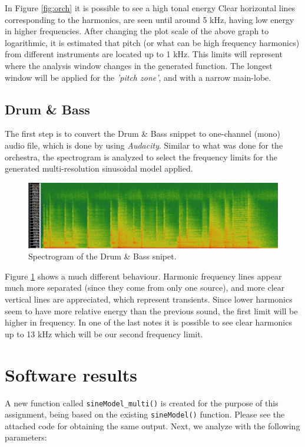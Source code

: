\documentclass[11pt]{article}
\begin{document}
In Figure \ref{fig:orch} it is possible to see a high tonal energy  Clear horizontal lines corresponding to the harmonics, are seen until around 5 kHz, having low energy in higher frequencies. After changing the plot scale of the above graph to logarithmic, it is estimated that pitch (or what can be high frequency harmonics) from different instruments are located up to 1 kHz. This limits will represent where the analysis window changes in the generated function. The longest window will be applied for the \textit{'pitch zone'}, and with a narrow main-lobe.

\subsection{Drum \& Bass}

The first step is to convert the Drum \& Bass snippet to one-channel (mono) audio file, which is done by using \textit{Audacity}. Similar to what was done for the orchestra, the spectrogram is analyzed to select the frequency limits for the generated multi-resolution sinusoidal model applied. 

\begin{figure}[h]
  \includegraphics[width=\linewidth]{dbv.png}
  \caption{Spectrogram of the Drum \& Bass snipet.}
  \label{fig:dbv}
\end{figure}

Figure \ref{fig:dbv} shows a much different behaviour. Harmonic frequency lines appear much more separated (since they come from only one source), and more clear vertical lines are appreciated, which represent transients. Since lower harmonics seem to have more relative energy than the previous sound, the first limit will be higher in frequency. In one of the last notes it is possible to see clear harmonics up to 13 kHz which will be our second frequency limit.

\section{Software results}

A new function called \texttt{sineModel\_multi()} is created for the purpose of this assignment, being based on the existing \texttt{sineModel()} function. Please see the attached code for obtaining the same output. Next, we analyze with the following parameters:
\end{document}
